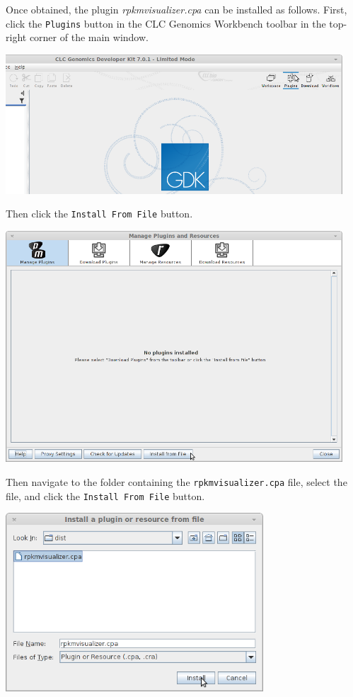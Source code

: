 \documentclass[12pt,letterpaper]{article}
\begin{document}
Once obtained, the plugin \textit{rpkmvisualizer.cpa} can be installed as
follows.  First, click the \texttt{Plugins} button in the CLC Genomics
Workbench toolbar in the top-right corner of the main window.

\begin{center}
    \includegraphics[width=34em]{plugins-button.png}
\end{center}

Then click the \texttt{Install From File} button.

\begin{center}
    \includegraphics[width=34em]{install-from-file-button.png}
\end{center}

Then navigate to the folder containing the \texttt{rpkmvisualizer.cpa} file,
select the file, and click the \texttt{Install From File} button.

\begin{center}
    \includegraphics[width=26em]{install-button.png}
\end{center}
\end{document}

